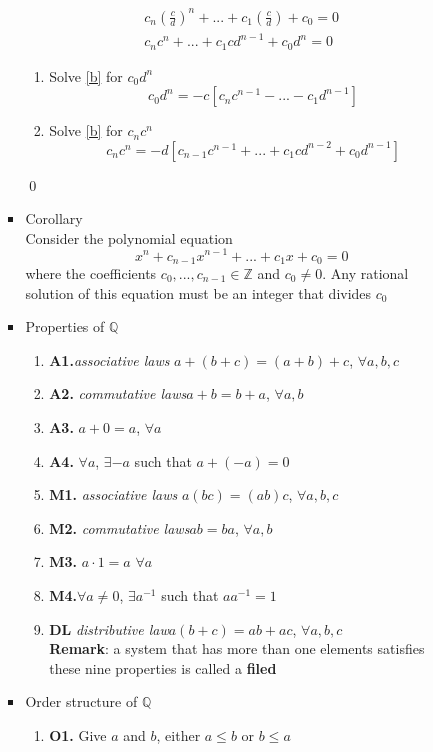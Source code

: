 \documentclass[12pt]{article}
\begin{document}
\begin{enumerate}
\begin{itemize}
\begin{itemize}
		\begin{subequations}	
		\begin{align}
		c_n\left(\frac{c}{d}\right)^n+...+c_1\left(\frac{c}{d}\right)+c_0=0 \label{a} \\ 
		c_nc^n+...+c_1cd^{n-1}+c_0d^n=0 \label{b}		
		\end{align}
\end{subequations}				
			\begin{enumerate}
		\item Solve \eqref{b} for $c_0d^n$
		$$c_0d^n=-c\left[c_nc^{n-1}-...-c_1d^{n-1}\right] $$
		\item Solve \eqref{b} for $c_nc^n$
		$$c_nc^n=-d\left[c_{n-1}c^{n-1}+...+c_1cd^{n-2}+c_0d^{n-1}\right]$$
\end{enumerate}		
\qed
\item Corollary\\
Consider the polynomial equation $$x^n+c_{n-1}x^{n-1}+...+c_1x+c_0=0$$ where the coefficients $c_0, ..., c_{n-1}\in \mathbb{Z}$ and $c_0\not=0$. Any rational solution of this equation must be an integer that divides $c_0$
\item Properties of $\mathbb{Q}$
	\begin{enumerate}
	\item \textbf{A1.}\textit{associative laws} $a+(b+c)=(a+b)+c$, $\forall a,b,c$
	\item \textbf{A2.} \textit{commutative laws}$a+b=b+a$, $\forall a,b$
	\item\textbf{A3.} $a+0=a$, $\forall a$
	\item\textbf{A4.} $\forall a$, $\exists -a$ such that $a+(-a)=0$
	\item\textbf{M1.} \textit{associative laws} $a(bc)=(ab)c$, $\forall a,b,c$
	\item\textbf{M2.} \textit{commutative laws}$ab=ba$, $ \forall a,b$
	\item \textbf{M3. } $a\cdot 1=a$ $\forall a$
	\item\textbf{M4.}$ \forall a\not=0$, $\exists a^{-1}$ such that $ aa^{-1}=1$
	\item\textbf{DL} \textit{distributive law}$a(b+c)=ab+ac$, $\forall a,b,c$\\
	\textbf{Remark}: a system that has more than one elements satisfies these nine properties is called a \textbf{filed}
	\end{enumerate}
	\item Order structure of $\mathbb{Q}$
		\begin{enumerate}
		\item \textbf{O1.} Give $a$ and $b$, either $a\leq  b$ or $b\leq a$

\end{enumerate}
\end{itemize}
\end{itemize}
\end{enumerate}
\end{document}
